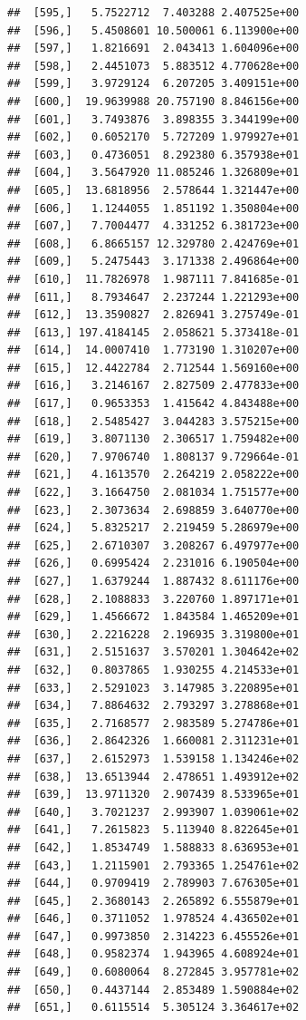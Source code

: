 \documentclass[article]{jss}\usepackage[]{graphicx}\usepackage[]{xcolor}
\makeatletter
\newenvironment{kframe}{%
 \def\at@end@of@kframe{}%
 \ifinner\ifhmode%
  \def\at@end@of@kframe{\end{minipage}}%
  \begin{minipage}{\columnwidth}%
 \fi\fi%
 \def\FrameCommand##1{\hskip\@totalleftmargin \hskip-\fboxsep
 \colorbox{shadecolor}{##1}\hskip-\fboxsep
     \hskip-\linewidth \hskip-\@totalleftmargin \hskip\columnwidth}%
 \MakeFramed {\advance\hsize-\width
   \@totalleftmargin\z@ \linewidth\hsize
   \@setminipage}}%
 {\par\unskip\endMakeFramed%
 \at@end@of@kframe}
\newenvironment{knitrout}{}{} %
\makeatother
\begin{document}
\begin{knitrout}
\begin{kframe}
\begin{verbatim}
##  [595,]   5.7522712  7.403288 2.407525e+00
##  [596,]   5.4508601 10.500061 6.113900e+00
##  [597,]   1.8216691  2.043413 1.604096e+00
##  [598,]   2.4451073  5.883512 4.770628e+00
##  [599,]   3.9729124  6.207205 3.409151e+00
##  [600,]  19.9639988 20.757190 8.846156e+00
##  [601,]   3.7493876  3.898355 3.344199e+00
##  [602,]   0.6052170  5.727209 1.979927e+01
##  [603,]   0.4736051  8.292380 6.357938e+01
##  [604,]   3.5647920 11.085246 1.326809e+01
##  [605,]  13.6818956  2.578644 1.321447e+00
##  [606,]   1.1244055  1.851192 1.350804e+00
##  [607,]   7.7004477  4.331252 6.381723e+00
##  [608,]   6.8665157 12.329780 2.424769e+01
##  [609,]   5.2475443  3.171338 2.496864e+00
##  [610,]  11.7826978  1.987111 7.841685e-01
##  [611,]   8.7934647  2.237244 1.221293e+00
##  [612,]  13.3590827  2.826941 3.275749e-01
##  [613,] 197.4184145  2.058621 5.373418e-01
##  [614,]  14.0007410  1.773190 1.310207e+00
##  [615,]  12.4422784  2.712544 1.569160e+00
##  [616,]   3.2146167  2.827509 2.477833e+00
##  [617,]   0.9653353  1.415642 4.843488e+00
##  [618,]   2.5485427  3.044283 3.575215e+00
##  [619,]   3.8071130  2.306517 1.759482e+00
##  [620,]   7.9706740  1.808137 9.729664e-01
##  [621,]   4.1613570  2.264219 2.058222e+00
##  [622,]   3.1664750  2.081034 1.751577e+00
##  [623,]   2.3073634  2.698859 3.640770e+00
##  [624,]   5.8325217  2.219459 5.286979e+00
##  [625,]   2.6710307  3.208267 6.497977e+00
##  [626,]   0.6995424  2.231016 6.190504e+00
##  [627,]   1.6379244  1.887432 8.611176e+00
##  [628,]   2.1088833  3.220760 1.897171e+01
##  [629,]   1.4566672  1.843584 1.465209e+01
##  [630,]   2.2216228  2.196935 3.319800e+01
##  [631,]   2.5151637  3.570201 1.304642e+02
##  [632,]   0.8037865  1.930255 4.214533e+01
##  [633,]   2.5291023  3.147985 3.220895e+01
##  [634,]   7.8864632  2.793297 3.278868e+01
##  [635,]   2.7168577  2.983589 5.274786e+01
##  [636,]   2.8642326  1.660081 2.311231e+01
##  [637,]   2.6152973  1.539158 1.134246e+02
##  [638,]  13.6513944  2.478651 1.493912e+02
##  [639,]  13.9711320  2.907439 8.533965e+01
##  [640,]   3.7021237  2.993907 1.039061e+02
##  [641,]   7.2615823  5.113940 8.822645e+01
##  [642,]   1.8534749  1.588833 8.636953e+01
##  [643,]   1.2115901  2.793365 1.254761e+02
##  [644,]   0.9709419  2.789903 7.676305e+01
##  [645,]   2.3680143  2.265892 6.555879e+01
##  [646,]   0.3711052  1.978524 4.436502e+01
##  [647,]   0.9973850  2.314223 6.455526e+01
##  [648,]   0.9582374  1.943965 4.608924e+01
##  [649,]   0.6080064  8.272845 3.957781e+02
##  [650,]   0.4437144  2.853489 1.590884e+02
##  [651,]   0.6115514  5.305124 3.364617e+02

\end{verbatim}
\end{kframe}
\end{knitrout}
\end{document}
